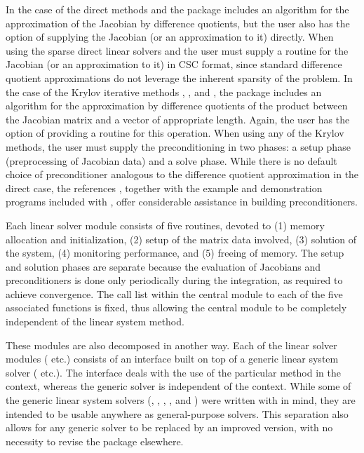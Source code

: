 In the case of the direct methods {\idadense} and {\idaband}
the package includes an algorithm for the approximation of the Jacobian by difference
quotients, but the user also has the option of supplying the Jacobian
(or an approximation to it) directly. When using the sparse direct
linear solvers {\idaklu} and {\idasuperlumt} the user must supply a
routine for the Jacobian (or an approximation to it) in CSC format,
since standard difference quotient approximations do not leverage the
inherent sparsity of the problem. In the case of the Krylov iterative methods 
{\idaspgmr}, {\idaspbcg}, and {\idasptfqmr}, the package includes an algorithm for
the approximation by difference quotients of the product between the Jacobian matrix
and a vector of appropriate length. Again, the user has the option of providing
a routine for this operation.
When  using any of the Krylov
methods, the user must supply the preconditioning in two phases: 
a setup phase (preprocessing of Jacobian data) and a solve phase.
While there is no default
choice of preconditioner analogous to the difference quotient
approximation in the direct case, the references
\cite{BrHi:89, Byr:92}, together with
the example and demonstration programs included with {\idas}, offer
considerable assistance in building preconditioners.

Each {\idas} linear solver module consists of five routines, devoted to
(1) memory allocation and initialization, (2) setup of the matrix data
involved, (3) solution of the system, (4) monitoring performance,
and (5) freeing of memory.  
The setup and solution phases are separate because the evaluation of
Jacobians and preconditioners is done only periodically during the
integration, as required to achieve convergence. The call list within
the central {\idas} module to each of the five associated functions is
fixed, thus allowing the central module to be completely independent
of the linear system method.

These modules are also decomposed in another way.
Each of the linear solver modules ({\idadense} etc.) consists of an
interface built on top of a generic linear system solver ({\dense}
etc.).  The interface deals with the use of the particular method in
the {\idas} context, whereas the generic solver is independent of the
context.  While some of the generic linear system solvers ({\dense},
{\band}, {\spgmr}, {\spbcg}, and {\sptfqmr}) were written with
{\sundials} in mind, they are intended to be usable anywhere as
general-purpose solvers.  This separation also allows for any generic
solver to be replaced by an improved version, with no necessity to
revise the {\idas} package elsewhere. 

